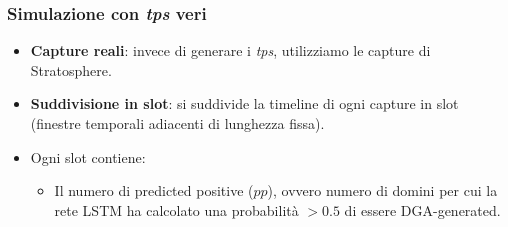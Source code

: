 \documentclass{beamer}
\begin{document}
\begin{frame}[plain]
\end{frame}



\begin{frame}
    \frametitle{Simulazione con \textit{tps} veri}
    \begin{itemize}
        \item \textbf{Capture reali}: invece di generare i \textit{tps}, utilizziamo le capture di Stratosphere.
        \item \textbf{Suddivisione in slot}: si suddivide la timeline di ogni capture in slot (finestre
        temporali adiacenti di lunghezza fissa).
        \item Ogni slot contiene:
        \begin{itemize}
            \item Il numero di predicted positive ($pp$), ovvero numero di domini
            per cui la rete LSTM ha calcolato una probabilità $> 0.5$ di essere
            DGA-generated.
        \end{itemize}
    \end{itemize}
\end{frame}
\end{document}
